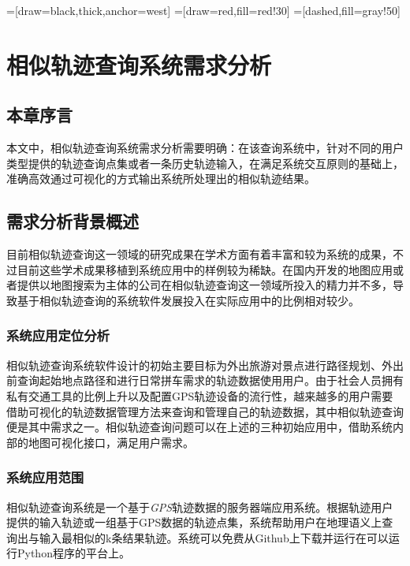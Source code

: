 

\usetikzlibrary{arrows,shapes,positioning,shadows,trees}
=[draw=black,thick,anchor=west]
=[draw=red,fill=red!30]
=[dashed,fill=gray!50]

\chapter{相似轨迹查询系统需求分析}
\label{chap:system requirement specification}

\section{本章序言}
\label{sec:requirement introduction}
本文中，相似轨迹查询系统需求分析需要明确：在该查询系统中，针对不同的用户类型提供的轨迹查询点集或者一条历史轨迹输入，在满足系统交互原则的基础上，准确高效通过可视化的方式输出系统所处理出的相似轨迹结果。

\section{需求分析背景概述}
\label{sec:requirement background}
目前相似轨迹查询这一领域的研究成果在学术方面有着丰富和较为系统的成果，不过目前这些学术成果移植到系统应用中的样例较为稀缺。在国内开发的地图应用或者提供以地图搜索为主体的公司在相似轨迹查询这一领域所投入的精力并不多，导致基于相似轨迹查询的系统软件发展投入在实际应用中的比例相对较少。

\subsection{系统应用定位分析}
\label{subsec:system orientation}
相似轨迹查询系统软件设计的初始主要目标为外出旅游对景点进行路径规划、外出前查询起始地点路径和进行日常拼车需求的轨迹数据使用用户。由于社会人员拥有私有交通工具的比例上升以及配置GPS轨迹设备的流行性，越来越多的用户需要借助可视化的轨迹数据管理方法来查询和管理自己的轨迹数据，其中相似轨迹查询便是其中需求之一。相似轨迹查询问题可以在上述的三种初始应用中，借助系统内部的地图可视化接口，满足用户需求。

\subsection{系统应用范围}
\label{subsec:scope}
相似轨迹查询系统是一个基于\emph{GPS}轨迹数据的服务器端应用系统。根据轨迹用户提供的输入轨迹或一组基于GPS数据的轨迹点集，系统帮助用户在地理语义上查询出与输入最相似的k条结果轨迹。系统可以免费从Github上下载并运行在可以运行Python程序的平台上。

